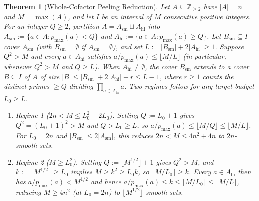 \documentclass[11pt]{article}
\newtheorem{theorem}{Theorem}
\theoremstyle{remark}
\begin{document}
\begin{theorem}[Whole-Cofactor Peeling Reduction]
\label{thm:peel}
Let $A \subseteq \mathbb{Z}_{\ge 2}$ have $|A| = n$ and $M = \max(A)$, and let $I$ be an interval of $M$ consecutive positive integers. For an integer $Q \ge 2$, partition $A = A_{\mathrm{sm}} \sqcup A_{\mathrm{hi}}$ into $A_{\mathrm{sm}} := \{a \in A : p_{\max}(a) < Q\}$ and $A_{\mathrm{hi}} := \{a \in A : p_{\max}(a) \ge Q\}$. Let $B_{\mathrm{sm}} \subseteq I$ cover $A_{\mathrm{sm}}$ (with $B_{\mathrm{sm}} = \emptyset$ if $A_{\mathrm{sm}} = \emptyset$), and set $L := |B_{\mathrm{sm}}| + 2 |A_{\mathrm{hi}}| \ge 1$. Suppose $Q^2 > M$ and every $a \in A_{\mathrm{hi}}$ satisfies $a / p_{\max}(a) \le \lfloor M / L \rfloor$ (in particular, whenever $Q^2 > M$ and $Q \ge L$). When $A_{\mathrm{hi}} \neq \emptyset$, the cover $B_{\mathrm{sm}}$ extends to a cover $B \subseteq I$ of $A$ of size $|B| \le |B_{\mathrm{sm}}| + 2 |A_{\mathrm{hi}}| - r \le L - 1$, where $r \ge 1$ counts the distinct primes $\ge Q$ dividing $\prod_{a \in A_{\mathrm{hi}}} a$. Two regimes follow for any target budget $L_0 \ge L$.
\begin{enumerate}
\item \emph{Regime 1 ($2 n < M \le L_0^2 + 2 L_0$).} Setting $Q := L_0 + 1$ gives $Q^2 = (L_0 + 1)^2 > M$ and $Q > L_0 \ge L$, so $a / p_{\max}(a) \le \lfloor M / Q \rfloor \le \lfloor M / L \rfloor$. For $L_0 = 2 n$ and $|B_{\mathrm{sm}}| \le 2 |A_{\mathrm{sm}}|$, this reduces $2 n < M \le 4 n^2 + 4 n$ to $2 n$-smooth sets.
\item \emph{Regime 2 ($M \ge L_0^2$).} Setting $Q := \lfloor M^{1/2} \rfloor + 1$ gives $Q^2 > M$, and $k := \lfloor M^{1/2} \rfloor \ge L_0$ implies $M \ge k^2 \ge L_0 k$, so $\lfloor M / L_0 \rfloor \ge k$. Every $a \in A_{\mathrm{hi}}$ then has $a / p_{\max}(a) < M^{1/2}$ and hence $a / p_{\max}(a) \le k \le \lfloor M / L_0 \rfloor \le \lfloor M / L \rfloor$, reducing $M \ge 4 n^2$ (at $L_0 = 2 n$) to $\lfloor M^{1/2} \rfloor$-smooth sets.
\end{enumerate}
\end{theorem}
\end{document}
